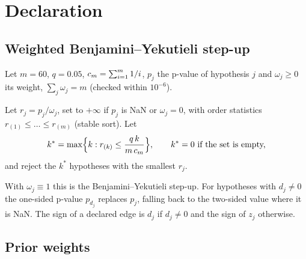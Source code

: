 \section{Declaration}
\label{spec:fdr}

\subsection{Weighted Benjamini--Yekutieli step-up}
\label{spec:fdr.wby}

Let $m = 60$, $q = 0.05$, $c_m = \sum_{i=1}^m 1/i$, $p_j$ the p-value of hypothesis $j$ and $\omega_j \ge 0$ its weight, $\sum_j \omega_j = m$ (checked within $10^{-6}$).

\begin{definition}
Let $r_j = p_j/\omega_j$, set to $+\infty$ if $p_j$ is NaN or $\omega_j = 0$, with order statistics $r_{(1)} \le \dots \le r_{(m)}$ (stable sort). Let
\begin{equation*}
k^* = \max\Bigl\{k : r_{(k)} \le \frac{q\,k}{m\,c_m}\Bigr\}, \qquad k^* = 0 \text{ if the set is empty,}
\end{equation*}
and reject the $k^*$ hypotheses with the smallest $r_j$.
\end{definition}

\noindent With $\omega_j \equiv 1$ this is the Benjamini--Yekutieli step-up. For hypotheses with $d_j \neq 0$ the one-sided p-value $p_{d_j}$ replaces $p_j$, falling back to the two-sided value where it is NaN. The sign of a declared edge is $d_j$ if $d_j \neq 0$ and the sign of $z_j$ otherwise.


\subsection{Prior weights}
\label{spec:fdr.weights}

